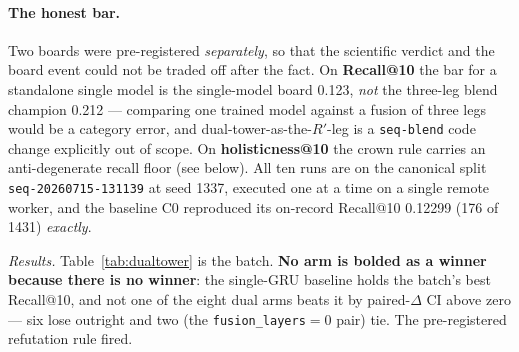 \documentclass[11pt]{article}
\newcommand{\dsid}[1]{\texttt{\small #1}}
\newcommand{\Rp}{\ensuremath{R'}}
\begin{document}
\paragraph{The honest bar.} Two boards were pre-registered \emph{separately}, so
that the scientific verdict and the board event could not be traded off after the
fact. On \textbf{Recall@10} the bar for a standalone single model is the
single-model board \num{0.123}, \emph{not} the three-leg blend champion
\num{0.212} --- comparing one trained model against a fusion of three legs would
be a category error, and dual-tower-as-the-\Rp-leg is a \texttt{seq-blend} code
change explicitly out of scope. On \textbf{holisticness@10} the crown rule
carries an anti-degenerate recall floor (see below). All ten runs are on the
canonical split \dsid{seq-20260715-131139} at seed 1337, executed one at a time
on a single remote worker, and the baseline C0 reproduced its on-record
Recall@10 \num{0.12299} (\num{176} of \num{1431}) \emph{exactly}.

\emph{Results.} Table~\ref{tab:dualtower} is the batch. \textbf{No arm is bolded
as a winner because there is no winner}: the single-GRU baseline holds the
batch's best Recall@10, and not one of the eight dual arms beats it by
paired-$\Delta$ CI above zero --- six lose outright and two (the
\texttt{fusion\_layers}${}=0$ pair) tie. The pre-registered refutation rule
fired.
\end{document}
